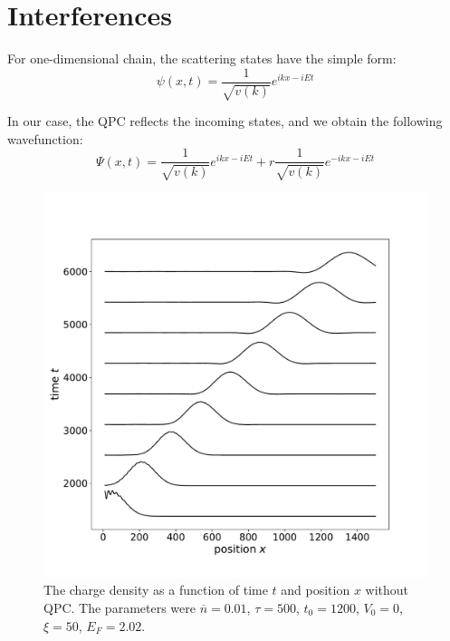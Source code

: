 \documentclass[aps,prl,preprint,groupedaddress]{revtex4-1}
\begin{document}
\section{Interferences}
For one-dimensional chain, the scattering states have the simple form:
\begin{equation}
	\psi(x,t) =  \frac{1}{\sqrt{v(k)}} e^{ikx - iEt}
\end{equation}

In our case, the QPC reflects the incoming states, and we obtain the following wavefunction:
\begin{equation}
\Psi(x,t) = \frac{1}{\sqrt{v(k)}} e^{ikx - iEt} + r\frac{1}{\sqrt{v(k)}} e^{-ikx - iEt}
\end{equation}
\begin{figure}
	\centering
	\includegraphics[width=0.7\linewidth]{../figures/density_off_202}
	\caption{The charge density as a function of time $t$ and position $x$ without QPC. The parameters were $\overline{n} =0.01$, $\tau = 500$, $t_0 =1200$, $V_0 = 0$, $\xi = 50$, $E_F =2.02$.  }
	\label{fig:densityoff202}
\end{figure}
\end{document}
